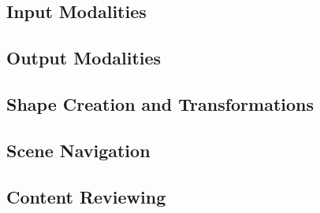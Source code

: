 
\subsection{Input Modalities}


\subsection{Output Modalities}


\subsection{Shape Creation and Transformations}


\subsection{Scene Navigation}


\subsection{Content Reviewing}

